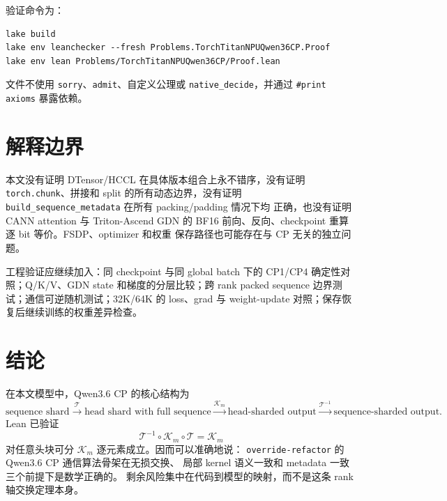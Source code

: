 \documentclass[11pt,a4paper]{ctexart}
\newcommand{\Tmap}{\mathcal T}
\newcommand{\Kernel}{\mathcal K}
\begin{document}
验证命令为：
\begin{verbatim}
lake build
lake env leanchecker --fresh Problems.TorchTitanNPUQwen36CP.Proof
lake env lean Problems/TorchTitanNPUQwen36CP/Proof.lean
\end{verbatim}
文件不使用 \texttt{sorry}、\texttt{admit}、自定义公理或
\texttt{native\_decide}，并通过 \texttt{\#print axioms} 暴露依赖。

\section{解释边界}

本文没有证明 DTensor/HCCL 在具体版本组合上永不错序，没有证明
\texttt{torch.chunk}、拼接和 split 的所有动态边界，没有证明
\texttt{build\_sequence\_metadata} 在所有 packing/padding 情况下均
正确，也没有证明 CANN attention 与 Triton-Ascend GDN 的 BF16
前向、反向、checkpoint 重算逐 bit 等价。FSDP、optimizer 和权重
保存路径也可能存在与 CP 无关的独立问题。

工程验证应继续加入：同 checkpoint 与同 global batch 下的 CP1/CP4
确定性对照；Q/K/V、GDN state 和梯度的分层比较；跨 rank packed
sequence 边界测试；通信可逆随机测试；32K/64K 的 loss、grad 与
weight-update 对照；保存恢复后继续训练的权重差异检查。

\section{结论}

在本文模型中，Qwen3.6 CP 的核心结构为
\[
\text{sequence shard}
\xrightarrow{\Tmap}
\text{head shard with full sequence}
\xrightarrow{\Kernel_m}
\text{head-sharded output}
\xrightarrow{\Tmap^{-1}}
\text{sequence-sharded output}.
\]
Lean 已验证
\[
\boxed{\Tmap^{-1}\circ\Kernel_m\circ\Tmap=\Kernel_m}
\]
对任意头块可分 $\Kernel_m$ 逐元素成立。因而可以准确地说：
\texttt{override-refactor} 的 Qwen3.6 CP 通信算法骨架在无损交换、
局部 kernel 语义一致和 metadata 一致三个前提下是数学正确的。
剩余风险集中在代码到模型的映射，而不是这条 rank 轴交换定理本身。
\end{document}
